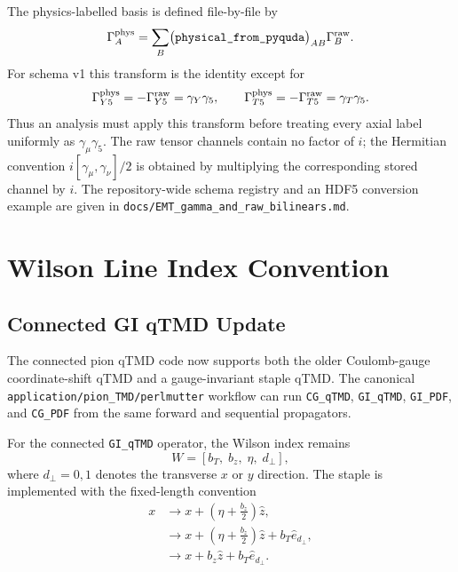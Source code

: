 \documentclass[11pt,a4paper]{article}
\begin{document}
The physics-labelled basis is defined file-by-file by
\begin{equation}
 \Gamma_A^{\rm phys}
 =\sum_B
 \bigl(\texttt{physical\_from\_pyquda}\bigr)_{AB}
 \Gamma_B^{\rm raw}.
\end{equation}
For schema v1 this transform is the identity except for
\begin{equation}
 \Gamma_{Y5}^{\rm phys}=-\Gamma_{Y5}^{\rm raw}
 =\gamma_Y\gamma_5,\qquad
 \Gamma_{T5}^{\rm phys}=-\Gamma_{T5}^{\rm raw}
 =\gamma_T\gamma_5.
\end{equation}
Thus an analysis must apply this transform before treating every axial label
uniformly as $\gamma_\mu\gamma_5$.  The raw tensor channels contain no factor
of $i$; the Hermitian convention
$i[\gamma_\mu,\gamma_\nu]/2$ is obtained by multiplying the corresponding
stored channel by $i$.  The repository-wide schema registry and an HDF5
conversion example are given in
\texttt{docs/EMT\_gamma\_and\_raw\_bilinears.md}.

\section{Wilson Line Index Convention}
\label{app:wilson}

\subsection*{Connected GI qTMD Update}

The connected pion qTMD code now supports both the older Coulomb-gauge
coordinate-shift qTMD and a gauge-invariant staple qTMD.  The canonical
\texttt{application/pion\_TMD/perlmutter} workflow can run
\texttt{CG\_qTMD}, \texttt{GI\_qTMD}, \texttt{GI\_PDF}, and
\texttt{CG\_PDF} from the same forward and sequential propagators.

For the connected \texttt{GI\_qTMD} operator, the Wilson index remains
\begin{equation}
  W = [b_T,\; b_z,\; \eta,\; d_\perp],
\end{equation}
where $d_\perp=0,1$ denotes the transverse $x$ or $y$ direction.  The staple is
implemented with the fixed-length convention
\begin{align}
  x
  &\rightarrow x + \left(\eta + \frac{b_z}{2}\right)\hat z, \\
  &\rightarrow x + \left(\eta + \frac{b_z}{2}\right)\hat z
       + b_T \hat e_{d_\perp}, \\
  &\rightarrow x + b_z \hat z + b_T \hat e_{d_\perp}.
\end{align}
\end{document}
